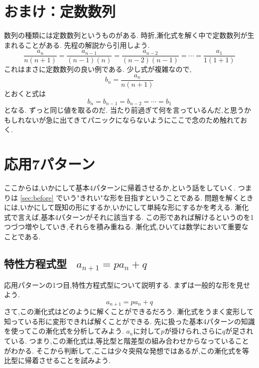 \documentclass[dvipdfmx,a4paper,11pt,fleqn,openany]{jsbook}
\begin{document}
  \section{おまけ：定数数列}
    数列の種類には定数数列というものがある.
    時折,漸化式を解く中で定数数列が生まれることがある.
    先程の解説から引用しよう.
    \[
      \frac{a_{n}}{n(n+1)}=\frac{a_{n-1}}{(n-1)(n)}=\frac{a_{n-2}}{(n-2)(n-1)}=\cdots=\frac{a_{1}}{1(1+1)}
    \]
    これはまさに定数数列の良い例である.
    少し式が複雑なので,
    \[
      b_n=\frac{a_{n}}{n(n+1)}
    \]
    とおくと式は
    \[
      b_n=b_{n-1}=b_{n-2}=\cdots=b_1
    \]
    となる.
    ずっと同じ値を取るのだ.
    当たり前過ぎて何を言っているんだ,と思うかもしれないが急に出てきてパニックにならないようにここで念のため触れておく.

\section{応用7パターン}
  ここからは,いかにして基本4パターンに帰着させるか,という話をしていく.
  つまりは \ref{sec:before} でいう"きれい"な形を目指すということである.
  問題を解くときには,いかにして既知の形にするか,いかにして単純な形にするかを考える.
  漸化式で言えば,基本4パターンがそれに該当する.
  この形であれば解けるというのを1つづつ増やしていき,それらを積み重ねる.
  漸化式,ひいては数学において重要なことである.
  
  \subsection{特性方程式型 \, $a_{n+1}=pa_n+q$}
    応用パターンの1つ目,特性方程式型について説明する.
    まずは一般的な形を見せよう.
    \[
      a_{n+1}=pa_n+q
    \]
    さて,この漸化式はどのように解くことができるだろう.
    漸化式をうまく変形して知っている形に変形できれば解くことができる.
    先に扱った基本4パターンの知識を使ってこの漸化式を分析してみよう.
    $a_n$に対して$p$が掛けられ,さらに$q$が足されている.
    つまり,この漸化式は,等比型と階差型の組み合わせからなっていることがわかる.
    そこから判断して,ここは少々突飛な発想ではあるが,この漸化式を等比型に帰着させることを試みよう.
    
\end{document}
